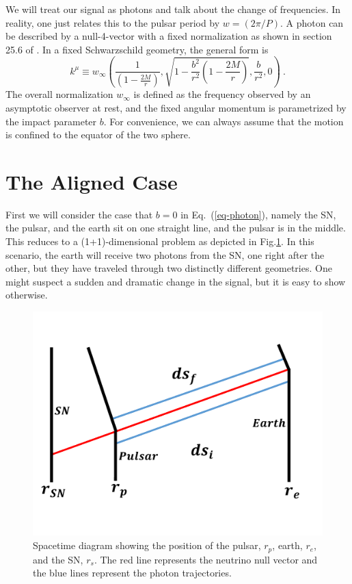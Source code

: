 \documentclass[aps,showpacs,onecolumn,floats,prd,superscriptaddress,nofootinbib]{revtex4}
\begin{document}
We will treat our signal as photons and talk about the change of frequencies. In reality, one just relates this to the pulsar period by $w=(2\pi/P)$. A photon can be described by a null-4-vector with a fixed normalization as shown in section 25.6 of \cite{MTW}. In a fixed Schwarzschild geometry, the general form is
\begin{equation}
	k^\mu \equiv w_{\infty}\left( \frac{1}{(1- \frac{2M}{r})}, \sqrt{ 1 - \frac{b^2}{r^2} \left( 1 - \frac{2M}{r} \right)}, \frac{b}{r^2}, 0 \right)~. \label{eq-photon}	
\end{equation}
The overall normalization $w_{\infty}$ is defined as the frequency observed by an asymptotic observer at rest, and the fixed angular momentum is parametrized by the impact parameter $b$. For convenience, we can always assume that the motion is confined to the equator of the two sphere.

\section{The Aligned Case}
\label{sec-1+1}

First we will consider the case that $b=0$ in Eq.~(\ref{eq-photon}), namely the SN, the pulsar, and the earth sit on one straight line, and the pulsar is in the middle. This reduces to a (1+1)-dimensional problem as depicted in Fig.\ref{fig:1}. In this scenario, the earth will receive two photons from the SN, one right after the other, but they have traveled through two distinctly different geometries. One might suspect a sudden and dramatic change in the signal, but it is easy to show otherwise.

\begin{figure}[tb!]
\begin{center}
\includegraphics[scale = 0.3]{Image2.pdf}
\caption{Spacetime diagram showing the position of the pulsar, $r_p$, earth, $r_e$, and the SN, $r_s$. The red line represents the neutrino null vector and the blue lines represent the photon trajectories.}
\label{fig:1}
\end{center}
\end{figure}
\end{document}
